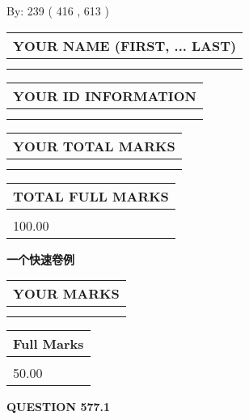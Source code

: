 \documentclass{ctexart}
\begin{document}
   
\hspace{1.0in} By: 
 239 ( 416 ,  613 )
   
   
   
   
\newpage 
\setcounter{page}{ 
   577001 } 
   
   
   
   
\noindent\begin{tabular}{|l|}
\hline
YOUR NAME (FIRST, ... LAST)  \\
\hline
 \\ 
 \\ 
\hline
\end{tabular}
\hspace{0.05in} \begin{tabular}{|l|}
\hline
 YOUR   ID   INFORMATION  \\
\hline
 \\ 
 \\ 
\hline
\end{tabular}
   
   
\vspace{0.2in}\noindent\begin{tabular}{|l|}
\hline
YOUR TOTAL MARKS  \\
\hline
 \\ 
 \\ 
\hline
\end{tabular}
\hspace{0.05in} \begin{tabular}{|l|}
\hline
TOTAL FULL MARKS  \\
\hline
 \\ 
100.00 \\
\hline
\end{tabular}
   
   
 \vspace{0.2in}
{\LARGE {\textbf{ 一个快速卷例}}}
   
   
  
\vspace{0.2in}
  
\noindent\begin{tabular}{|l|}
\hline
 YOUR MARKS  \\
\hline
 \\ 
 \\ 
\hline
\end{tabular}
\hspace{0.05in} \begin{tabular}{|l|}
\hline
 Full Marks  \\
\hline
 \\ 
50.00 \\
\hline
\end{tabular}
{\textbf{\Large{QUESTION
577.1 
}}}
  
\end{document}
